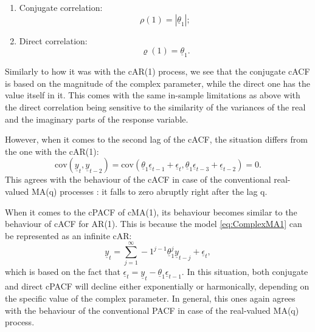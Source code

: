 \documentclass[
]{book}
\begin{document}
\begin{enumerate}
\def\labelenumi{\arabic{enumi}.}
\item
  Conjugate correlation:
  \begin{equation}
   \rho(1) = | \underline{\theta}_1 |;
   \label{eq:ComplexMA1ConjCor}
  \end{equation}
\item
  Direct correlation:
  \begin{equation}
   \varrho(1) =  \underline{\theta}_1.
   \label{eq:ComplexMA1DirCor}
  \end{equation}
\end{enumerate}

Similarly to how it was with the cAR(1) process, we see that the conjugate cACF is based on the magnitude of the complex parameter, while the direct one has the value itself in it. This comes with the same in-sample limitations as above with the direct correlation being sensitive to the similarity of the variances of the real and the imaginary parts of the response variable.

However, when it comes to the second lag of the cACF, the situation differs from the one with the cAR(1):
\begin{equation}
    \mathrm{cov} \left(\underline{y}_t, \underline{y}_{t-2} \right) = \mathrm{cov}\left( \underline{\theta}_1 \underline{\epsilon}_{t-1} + \underline{\epsilon}_t, \underline{\theta}_1 \underline{\epsilon}_{t-3} + \underline{\epsilon}_{t-2} \right) = 0 .
    \label{eq:ComplexMA1Lag2}
\end{equation}
This agrees with the behaviour of the cACF in case of the conventional real-valued MA(q) processes \citep{Box1976}: it falls to zero abruptly right after the lag q.

When it comes to the cPACF of cMA(1), its behaviour becomes similar to the behaviour of cACF for AR(1). This is because the model \eqref{eq:ComplexMA1} can be represented as an infinite cAR:
\begin{equation}
    \underline{y}_t = \sum_{j=1}^\infty -1^{j-1} \underline{\theta}_1^j \underline{y}_{t-j} + \underline{\epsilon}_t ,
    \label{eq:ComplexMA1Infinite}
\end{equation}
which is based on the fact that \(\underline{\epsilon}_t = \underline{y}_t - \underline{\theta}_1 \underline{\epsilon}_{t-1}\). In this situation, both conjugate and direct cPACF will decline either exponentially or harmonically, depending on the specific value of the complex parameter. In general, this ones again agrees with the behaviour of the conventional PACF in case of the real-valued MA(q) process.
\end{document}
